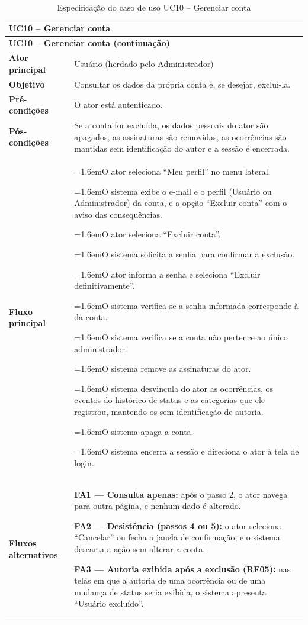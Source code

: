 \documentclass[12pt,a4paper]{article}
\newcommand{\ucitem}[2]{\par\noindent\hangindent=1.6em\hangafter=1\makebox[1.6em][l]{#1}#2}
\begin{document}
\begin{longtable}{|p{}|p{}|}
\caption{Especificação do caso de uso UC10 -- Gerenciar conta}
\label{tab:uc10} \\
\hline
\multicolumn{2}{|l|}{\textbf{UC10 -- Gerenciar conta}} \\
\hline
\endfirsthead

\hline
\multicolumn{2}{|l|}{\textbf{UC10 -- Gerenciar conta (continuação)}} \\
\hline
\endhead

\hline
\endfoot
\textbf{Ator principal} & Usuário (herdado pelo Administrador) \\ \hline
\textbf{Objetivo} & Consultar os dados da própria conta e, se desejar, excluí-la. \\ \hline
\textbf{Pré-condições} & O ator está autenticado. \\ \hline
\textbf{Pós-condições} & Se a conta for excluída, os dados pessoais do ator são apagados, as assinaturas são removidas, as ocorrências são mantidas sem identificação do autor e a sessão é encerrada. \\ \hline
\textbf{Fluxo principal} &
\ucitem{1.}{O ator seleciona ``Meu perfil'' no menu lateral.}
\ucitem{2.}{O sistema exibe o e-mail e o perfil (Usuário ou Administrador) da conta, e a opção ``Excluir conta'' com o aviso das consequências.}
\ucitem{3.}{O ator seleciona ``Excluir conta''.}
\ucitem{4.}{O sistema solicita a senha para confirmar a exclusão.}
\ucitem{5.}{O ator informa a senha e seleciona ``Excluir definitivamente''.}
\ucitem{6.}{O sistema verifica se a senha informada corresponde à da conta.}
\ucitem{7.}{O sistema verifica se a conta não pertence ao único administrador.}
\ucitem{8.}{O sistema remove as assinaturas do ator.}
\ucitem{9.}{O sistema desvincula do ator as ocorrências, os eventos do histórico de status e as categorias que ele registrou, mantendo-os sem identificação de autoria.}
\ucitem{10.}{O sistema apaga a conta.}
\ucitem{11.}{O sistema encerra a sessão e direciona o ator à tela de login.} \\ \hline
\textbf{Fluxos alternativos} &
\noindent \textbf{FA1 — Consulta apenas:} após o passo 2, o ator navega para outra página, e nenhum dado é alterado.
\par\smallskip\noindent \textbf{FA2 — Desistência (passos 4 ou 5):} o ator seleciona ``Cancelar'' ou fecha a janela de confirmação, e o sistema descarta a ação sem alterar a conta.
\par\smallskip\noindent \textbf{FA3 — Autoria exibida após a exclusão (RF05):} nas telas em que a autoria de uma ocorrência ou de uma mudança de status seria exibida, o sistema apresenta ``Usuário excluído''. \\ \hline

\end{longtable}
\end{document}
